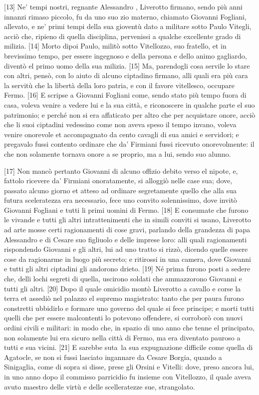 {[}13{]} Ne' tempi nostri, regnante Alessandro , Liverotto firmano,
sendo più anni innanzi rimaso piccolo, fu da uno suo zio materno,
chiamato Giovanni Fogliani, allevato, e ne' primi tempi della sua
gioventù dato a militare sotto Paulo Vitegli, acciò che, ripieno di
quella disciplina, pervenissi a qualche excellente grado di milizia.
{[}14{]} Morto dipoi Paulo, militò sotto Vitellozzo, suo fratello, et in
brevissimo tempo, per essere ingegnoso e della persona e dello animo
gagliardo, diventò el primo uomo della sua milizia. {[}15{]} Ma,
parendogli cosa servile lo stare con altri, pensò, con lo aiuto di
alcuno ciptadino firmano, alli quali era più cara la servitù che la
libertà della loro patria, e con il favore vitellesco, occupare Fermo.
{[}16{]} E scripse a Giovanni Fogliani come, sendo stato più tempo fuora
di casa, voleva venire a vedere lui e la sua città, e riconoscere in
qualche parte el suo patrimonio; e perché non si era affaticato per
altro che per acquistare onore, acciò che li suoi ciptadini vedessino
come non aveva speso il tempo invano, voleva venire onorevole et
accompagnato da cento cavagli di sua amici e servidori; e pregavalo
fussi contento ordinare che da' Firmiani fussi ricevuto onorevolmente:
il che non solamente tornava onore a se proprio, ma a lui, sendo suo
alunno.

\pagebreak

{[}17{]} Non mancò pertanto Giovanni di alcuno offizio debito verso el
nipote, e, fattolo ricevere da' Firmiani onoratamente, si alloggiò nelle
case sua; dove, passato alcuno giorno et atteso ad ordinare segretamente
quello che alla sua futura sceleratezza era necessario, fece uno convito
solennissimo, dove invitò Giovanni Fogliani e tutti li primi uomini di
Fermo. {[}18{]} E consumate che furono le vivande e tutti gli altri
intrattenimenti che in simili conviti si usano, Liverotto ad arte mosse
certi ragionamenti di cose gravi, parlando della grandezza di papa
Alessandro e di Cesare suo figliuolo e delle imprese loro: alli quali
ragionamenti rispondendo Giovanni e gli altri, lui ad uno tratto si
rizzò, dicendo quelle essere cose da ragionarme in luogo più secreto; e
ritirossi in una camera, dove Giovanni e tutti gli altri ciptadini gli
andorono drieto. {[}19{]} Né prima furono posti a sedere che, delli
lochi segreti di quella, uscirono soldati che ammazzorono Giovanni e
tutti gli altri. {[}20{]} Dopo il quale omicidio montò Liverotto a
cavallo e corse la terra et assediò nel palazzo el supremo magistrato:
tanto che per paura furono constretti ubbidirlo e formare uno governo
del quale si fece principe; e morti tutti quelli che per essere
malcontenti lo potevono offendere, si corroborò con nuovi ordini civili
e militari: in modo che, in spazio di uno anno che tenne el principato,
non solamente lui era sicuro nella città di Fermo, ma era diventato
pauroso a tutti e sua vicini. {[}21{]} E sarebbe suta\est\ la sua
expugnazione difficile come quella di Agatocle, se non si fussi lasciato
ingannare da Cesare Borgia, quando a Sinigaglia, come di sopra si disse,
prese gli Orsini e Vitelli: dove, preso ancora lui, in uno anno dopo il
commisso parricidio fu insieme con Vitellozzo, il quale aveva avuto
maestro delle virtù e delle scelleratezze sue, strangolato.

